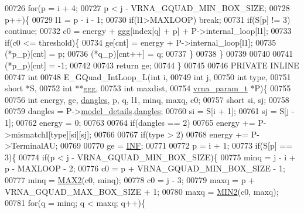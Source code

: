 \begin{DoxyCode}
00726     \textcolor{keywordflow}{for}(p = i + 4;
00727         p < j - VRNA\_GQUAD\_MIN\_BOX\_SIZE;
00728         p++)\{
00729       l1    = p - i - 1;
00730       \textcolor{keywordflow}{if}(l1>MAXLOOP) \textcolor{keywordflow}{break};
00731       \textcolor{keywordflow}{if}(S[p] != 3) \textcolor{keywordflow}{continue};
00732       c0  = energy + ggg[index[q] + p] + P->internal\_loop[l1];
00733         \textcolor{keywordflow}{if}(c0 <= threshold)\{
00734           ge[cnt]       = energy + P->internal\_loop[l1];
00735           (*p\_p)[cnt]   = p;
00736           (*q\_p)[cnt++] = q;
00737         \}
00738     \}
00739 
00740 
00741   (*p\_p)[cnt] = -1;
00742 
00743   \textcolor{keywordflow}{return} ge;
00744 \}
00745 
00746 PRIVATE INLINE
00747 \textcolor{keywordtype}{int}
00748 E\_GQuad\_IntLoop\_L(\textcolor{keywordtype}{int} i,
00749                   \textcolor{keywordtype}{int} j,
00750                   \textcolor{keywordtype}{int} type,
00751                   \textcolor{keywordtype}{short} *S,
00752                   \textcolor{keywordtype}{int} **ggg,
00753                   \textcolor{keywordtype}{int} maxdist,
00754                   \hyperlink{group__energy__parameters_structvrna__param__s}{vrna\_param\_t} *P)\{
00755 
00756   \textcolor{keywordtype}{int} energy, ge, \hyperlink{group__model__details_ga72b511ed1201f7e23ec437e468790d74}{dangles}, p, q, l1, minq, maxq, c0;
00757   \textcolor{keywordtype}{short} si, sj;
00758 
00759   dangles = P->\hyperlink{group__energy__parameters_a7b84353eb9075c595bad4ceb871bcae7}{model\_details}.\hyperlink{group__model__details_adcda4ff2ea77748ae0e8700288282efc}{dangles};
00760   si      = S[i + 1];
00761   sj      = S[j - 1];
00762   energy  = 0;
00763 
00764   \textcolor{keywordflow}{if}(dangles == 2)
00765     energy += P->mismatchI[type][si][sj];
00766 
00767   \textcolor{keywordflow}{if}(type > 2)
00768     energy += P->TerminalAU;
00769 
00770   ge = \hyperlink{energy__const_8h_a12c2040f25d8e3a7b9e1c2024c618cb6}{INF};
00771 
00772   p = i + 1;
00773   \textcolor{keywordflow}{if}(S[p] == 3)\{
00774     \textcolor{keywordflow}{if}(p < j - VRNA\_GQUAD\_MIN\_BOX\_SIZE)\{
00775       minq  = j - i + p - MAXLOOP - 2;
00776       c0    = p + VRNA\_GQUAD\_MIN\_BOX\_SIZE - 1;
00777       minq  = \hyperlink{group__utils_gadd91367918fadbc8d585940d6206d6d2}{MAX2}(c0, minq);
00778       c0    = j - 3;
00779       maxq  = p + VRNA\_GQUAD\_MAX\_BOX\_SIZE + 1;
00780       maxq  = \hyperlink{group__utils_ga2dd4a927a7f937f43a90c144d79107d8}{MIN2}(c0, maxq);
00781       \textcolor{keywordflow}{for}(q = minq; q < maxq; q++)\{

\end{DoxyCode}
